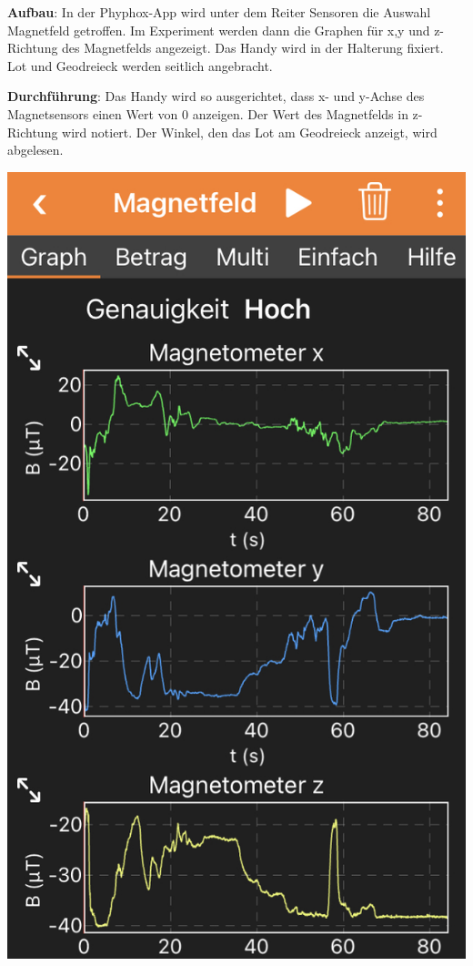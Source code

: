 \documentclass[../main.tex]{subfiles}
\begin{document}
\begin{tcolorbox}
    \vspace{0.2cm}
    \begin{minipage}[]{0.75\textwidth}
        \textbf{Aufbau}: In der Phyphox-App wird unter dem Reiter \glqq Sensoren\grqq{} die Auswahl \glqq Magnetfeld\grqq{} getroffen. Im Experiment werden dann die Graphen für x,y und z-Richtung des Magnetfelds angezeigt. Das Handy wird in der Halterung fixiert. Lot und Geodreieck werden seitlich angebracht.  

        \vspace{0.5cm}
        \textbf{Durchführung}: Das Handy wird so ausgerichtet, dass x- und y-Achse des Magnetsensors einen Wert von $0$ anzeigen. Der Wert des Magnetfelds in z-Richtung wird notiert. Der Winkel, den das Lot am Geodreieck anzeigt, wird abgelesen.  
    \end{minipage}
    \hspace{0.3cm}
    \begin{minipage}[]{0.2\textwidth}
        \includegraphics[width=\textwidth]{img/app}
    \end{minipage}


\end{tcolorbox}
\end{document}
